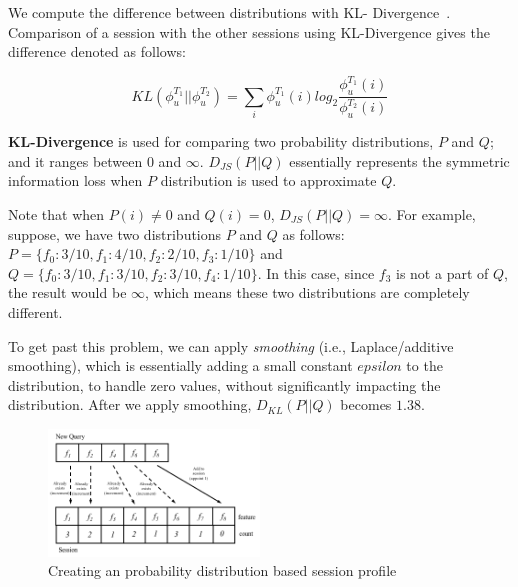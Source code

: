 We compute the difference between distributions with KL- Divergence~\cite{kullback1951information}.
Comparison of a session with the other sessions using KL-Divergence gives the difference denoted as follows:



\begin{equation}
KL(\phi^{T_1}_u || \phi^{T_2}_u) = \sum_i \phi^{T_1}_u(i)  log_2 \frac{\phi^{T_1}_u(i)}{\phi^{T_2}_u(i)}
\end{equation}

\textbf{KL-Divergence} is used for comparing two probability distributions, $P$ and $Q$; and it ranges between 0 and $\infty$. $D_{JS}(P||Q)$ essentially represents the symmetric information loss when $P$ distribution is used to approximate $Q$.

Note that when $P(i) \neq 0$ and $Q(i) = 0$,  $D_{JS}(P||Q)=\infty$. For example, suppose, we have two distributions $P$ and $Q$ as follows: $P = \{ f_0: 3/10, f_1: 4/10, f_2: 2/10, f_3: 1/10 \}$ and $Q = \{ f_0: 3/10, f_1: 3/10, f_2: 3/10, f_4: 1/10 \}$. In this case, since $f_3$ is not a part of $Q$, the result would be $\infty$, which means these two distributions are completely different. 

To get past this problem, we can apply \textit{smoothing} (i.e., Laplace/additive smoothing), which is essentially adding a small constant $epsilon$ to the distribution, to handle zero values, without significantly impacting the distribution. After we apply smoothing, $D_{KL}(P||Q)$ becomes $1.38$.

\begin{figure}[h!]
    \centering
    \includegraphics[width=0.5\textwidth]{graphics/entropy.png}
    \caption{Creating an probability distribution based session profile}
    \label{fig:entropySessionProfile}
\end{figure}

